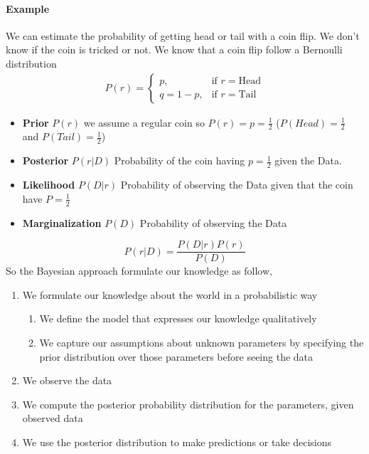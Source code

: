 \documentclass[../main.tex]{subfiles}
\begin{document}
\paragraph{Example} We can estimate the probability of getting head or tail with a coin flip. We don't know if the coin is tricked or not.
We know that a coin flip follow a Bernoulli distribution
\begin{align*}
    P(r)=
    \begin{cases}
        p,     & \text{if } r = \text{Head} \\
        q=1-p, & \text{if } r = \text{Tail}
    \end{cases}
\end{align*}
\begin{itemize}
    \item \textbf{Prior} $P(r)$ we assume a regular coin so $P(r) = p = \frac{1}{2}$ ($P(Head)=\frac{1}{2}$ and $P(Tail)=\frac{1}{2}$)
    \item \textbf{Posterior} $P(r|D)$ Probability of the coin having $p=\frac{1}{2}$ given the Data.
    \item \textbf{Likelihood} $P(D|r)$ Probability of observing the Data given that the coin have $P=\frac{1}{2}$
    \item \textbf{Marginalization} $P(D)$ Probability of observing the Data
\end{itemize}
\begin{equation*}
    P(r|D) = \frac{P(D|r)P(r)}{P(D)}
\end{equation*}
So the Bayesian approach formulate our knowledge as follow,
\begin{enumerate}
    \item We formulate our knowledge about the world in a probabilistic way
          \begin{enumerate}
              \item We define the model that expresses our knowledge qualitatively
              \item We capture our assumptions about unknown parameters by specifying the
                    prior distribution over those parameters before seeing the data
          \end{enumerate}
    \item We observe the data
    \item We compute the posterior probability distribution for the parameters, given observed data
    \item We use the posterior distribution to make predictions or take decisions
\end{enumerate}
\end{document}
